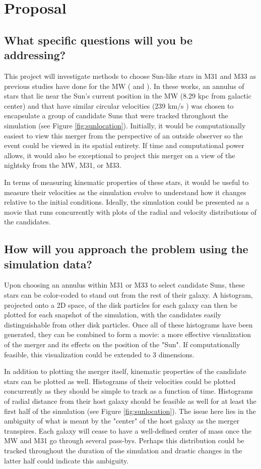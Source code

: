 \documentclass{aastex63}
\begin{document}
\section{Proposal} \label{sec:proposal}
\subsection{What specific questions will you be addressing?}
This project will investigate methods to choose Sun-like stars in M31 and M33 as previous studies have done for the MW (\cite{2012ApJ...753....9V} and \cite{2008MNRAS.386..461C}). In these works, an annulus of stars that lie near the Sun's current position in the MW (8.29 kpc from galactic center) and that have similar circular velocities (239 km/s \cite{2012ApJ...753....8V}) was chosen to encapsulate a group of candidate Suns that were tracked throughout the simulation (see Figure \ref{fig:sunlocation}). Initially, it would be computationally easiest to view this merger from the perspective of an outside observer so the event could be viewed in its spatial entirety. If time and computational power allows, it would also be exceptional to project this merger on a view of the nightsky from the MW, M31, or M33.

In terms of measuring kinematic properties of these stars, it would be useful to measure their velocities as the simulation evolve to understand how it changes relative to the initial conditions. Ideally, the simulation could be presented as a movie that runs concurrently with plots of the radial and velocity distributions of the candidates.

\subsection{How will you approach the problem using the simulation data?}
Upon choosing an annulus within M31 or M33 to select candidate Suns, these stars can be color-coded to stand out from the rest of their galaxy. A histogram, projected onto a 2D space, of the disk particles for each galaxy can then be plotted for each snapshot of the simulation, with the candidates easily distinguishable from other disk particles. Once all of these histograms have been generated, they can be combined to form a movie: a more effective visualization of the merger and its effects on the position of the "Sun". If computationally feasible, this visualization could be extended to 3 dimensions.

In addition to plotting the merger itself, kinematic properties of the candidate stars can be plotted as well. Histograms of their velocities could be plotted concurrently as they should be simple to track as a function of time. Histograms of radial distance from their host galaxy should be feasible as well for at least the first half of the simulation (see Figure \ref{fig:sunlocation}). The issue here lies in the ambiguity of what is meant by the "center" of the host galaxy as the merger transpires. Each galaxy will cease to have a well-defined center of mass once the MW and M31 go through several pass-bys. Perhaps this distribution could be tracked throughout the duration of the simulation and drastic changes in the latter half could indicate this ambiguity.
\end{document}
